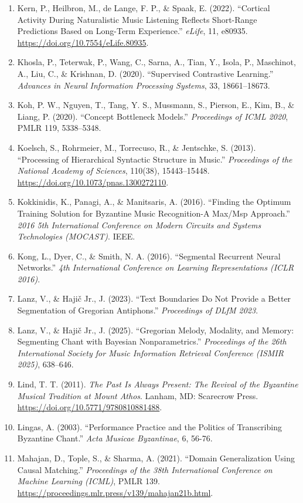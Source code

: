 \documentclass[11pt,a4paper]{article}
\begin{document}
\begin{enumerate}
\item
 Kern, P., Heilbron, M., de Lange, F. P., \& Spaak, E. (2022). ``Cortical Activity During Naturalistic Music Listening Reflects Short-Range Predictions Based on Long-Term Experience.'' \emph{eLife}, 11, e80935. \url{https://doi.org/10.7554/eLife.80935}.
\item
 Khosla, P., Teterwak, P., Wang, C., Sarna, A., Tian, Y., Isola, P., Maschinot, A., Liu, C., \& Krishnan, D. (2020). ``Supervised Contrastive Learning.'' \emph{Advances in Neural Information Processing Systems}, 33, 18661--18673.
\item
 Koh, P. W., Nguyen, T., Tang, Y. S., Mussmann, S., Pierson, E., Kim, B., \& Liang, P. (2020). ``Concept Bottleneck Models.'' \emph{Proceedings of ICML 2020}, PMLR 119, 5338--5348.
\item
 Koelsch, S., Rohrmeier, M., Torrecuso, R., \& Jentschke, S. (2013). ``Processing of Hierarchical Syntactic Structure in Music.'' \emph{Proceedings of the National Academy of Sciences}, 110(38), 15443--15448. \url{https://doi.org/10.1073/pnas.1300272110}.
\item
 Kokkinidis, K., Panagi, A., \& Manitsaris, A. (2016). ``Finding the Optimum Training Solution for Byzantine Music Recognition-A Max/Msp Approach.'' \emph{2016 5th International Conference on Modern Circuits and Systems Technologies (MOCAST)}. IEEE.
\item
 Kong, L., Dyer, C., \& Smith, N. A. (2016). ``Segmental Recurrent Neural Networks.'' \emph{4th International Conference on Learning Representations (ICLR 2016)}.
\item
 Lanz, V., \& Hajič Jr., J. (2023). ``Text Boundaries Do Not Provide a Better Segmentation of Gregorian Antiphons.'' \emph{Proceedings of DLfM 2023}.
\item
 Lanz, V., \& Hajič Jr., J. (2025). ``Gregorian Melody, Modality, and Memory: Segmenting Chant with Bayesian Nonparametrics.'' \emph{Proceedings of the 26th International Society for Music Information Retrieval Conference (ISMIR 2025)}, 638--646.
\item
 Lind, T. T. (2011). \emph{The Past Is Always Present: The Revival of the Byzantine Musical Tradition at Mount Athos}. Lanham, MD: Scarecrow Press. \url{https://doi.org/10.5771/9780810881488}.
\item
 Lingas, A. (2003). ``Performance Practice and the Politics of Transcribing Byzantine Chant.'' \emph{Acta Musicae Byzantinae}, 6, 56-76.
\item
 Mahajan, D., Tople, S., \& Sharma, A. (2021). ``Domain Generalization Using Causal Matching.'' \emph{Proceedings of the 38th International Conference on Machine Learning (ICML)}, PMLR 139. \url{https://proceedings.mlr.press/v139/mahajan21b.html}.

\end{enumerate}
\end{document}

